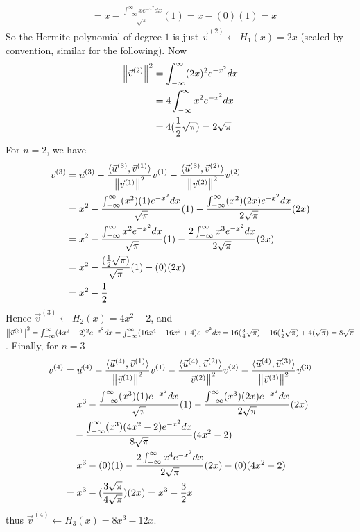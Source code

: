 \begin{solution}
\begin{align*}
&= x - \frac{\int_{-\infty}^{\infty} xe^{-x^2} dx}{\sqrt{\pi}} (1) = x - (0)(1) = x
\end{align*}
So the Hermite polynomial of degree $1$ is just $\vec{v}^{(2)} \leftarrow H_1(x) = 2x$ (scaled by convention, similar for the following). Now
\begin{align*}
\norm{\vec{v}^{(2)}}^2 &= \int_{-\infty}^{\infty} (2x)^2 e^{-x^2} dx \\
&= 4\int_{-\infty}^{\infty} x^2 e^{-x^2} dx \\
&= 4(\frac{1}{2}\sqrt{\pi}) = 2\sqrt{\pi}
\end{align*}
For $n=2$, we have
\begin{align*}
\vec{v}^{(3)} &= \vec{u}^{(3)} - \frac{\langle\vec{u}^{(3)}, \vec{v}^{(1)}\rangle}{\norm{\vec{v}^{(1)}}^2} \vec{v}^{(1)} - \frac{\langle\vec{u}^{(3)}, \vec{v}^{(2)}\rangle}{\norm{\vec{v}^{(2)}}^2} \vec{v}^{(2)} \\
&= x^2 - \frac{\int_{-\infty}^{\infty} (x^2)(1) e^{-x^2} dx}{\sqrt{\pi}} (1) - \frac{\int_{-\infty}^{\infty} (x^2)(2x) e^{-x^2} dx}{2\sqrt{\pi}} (2x) \\
&= x^2 - \frac{\int_{-\infty}^{\infty} x^2 e^{-x^2} dx}{\sqrt{\pi}} (1) - \frac{2 \int_{-\infty}^{\infty} x^3 e^{-x^2} dx}{2\sqrt{\pi}} (2x) \\
&= x^2 - \frac{(\frac{1}{2}\sqrt{\pi})}{\sqrt{\pi}} (1) - (0) (2x) \\
&= x^2 - \frac{1}{2}
\end{align*}
Hence $\vec{v}^{(3)} \leftarrow H_2(x) = 4x^2 - 2$, and $\norm{\vec{v}^{(3)}}^2 = \int_{-\infty}^{\infty} (4x^2 - 2)^2 e^{-x^2} dx = \int_{-\infty}^{\infty} (16 x^4 - 16 x^2 + 4)e^{-x^2} dx = 16(\frac{3}{4}\sqrt{\pi}) - 16(\frac{1}{2}\sqrt{\pi}) + 4(\sqrt{\pi}) = 8\sqrt{\pi}$. Finally, for $n=3$
\begin{align*}
\vec{v}^{(4)} &= \vec{u}^{(4)} - \frac{\langle\vec{u}^{(4)}, \vec{v}^{(1)}\rangle}{\norm{\vec{v}^{(1)}}^2} \vec{v}^{(1)} - \frac{\langle\vec{u}^{(4)}, \vec{v}^{(2)}\rangle}{\norm{\vec{v}^{(2)}}^2} \vec{v}^{(2)} - \frac{\langle\vec{u}^{(4)}, \vec{v}^{(3)}\rangle}{\norm{\vec{v}^{(3)}}^2} \vec{v}^{(3)}\\  
&= x^3 - \frac{\int_{-\infty}^{\infty} (x^3)(1) e^{-x^2} dx}{\sqrt{\pi}} (1) - \frac{\int_{-\infty}^{\infty} (x^3)(2x) e^{-x^2} dx}{2\sqrt{\pi}} (2x) \\
&\quad - \frac{\int_{-\infty}^{\infty} (x^3)(4x^2 - 2) e^{-x^2} dx}{8\sqrt{\pi}} (4x^2 - 2) \\
&= x^3 - (0)(1) - \frac{2\int_{-\infty}^{\infty} x^4 e^{-x^2} dx}{2\sqrt{\pi}} (2x) - (0)(4x^2 - 2) \\
&= x^3 - (\frac{3\sqrt{\pi}}{4\sqrt{\pi}})(2x) = x^3 - \frac{3}{2}x
\end{align*}
thus $\vec{v}^{(4)} \leftarrow H_3(x) = 8x^3 - 12x$.
\end{solution}

